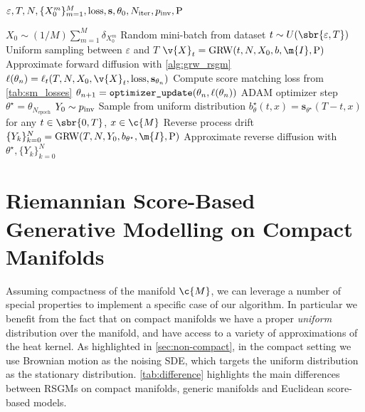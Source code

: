 \begin{algorithm}[!t]
	\caption{\small RSGM (Riemannian Score-Based Generative Model)}
	\label{alg:rsgm}
	\begin{algorithmic}[1]
		\small
		\Require $\varepsilon, T, N, \{X_0^m\}_{m=1}^M, \mathrm{loss}, \mathbf{s}, \theta_0, N_{\textrm{iter}}, p_{\textup{inv}}, \mathrm{P}$

		\State $X_0 \sim (1/M) \sum_{m=1}^M \delta_{X_0^m}$ \Comment Random mini-batch from dataset
		\State $t \sim U(\sbr{\varepsilon, T})$ \Comment Uniform sampling between $\varepsilon$ and $T$
		\State $\v{X}_t = \textrm{GRW}(t, N, X_0, b, \m{I}, \mathrm{P})$ \Comment Approximate forward diffusion with \cref{alg:grw_rsgm}
		\State $\ell(\theta_n) = \ell_t(T, N, X_0, \v{X}_t, \mathrm{loss}, \mathbf{s}_{\theta_n})$ \Comment Compute score matching loss from \cref{tab:sm_losses}
		\State $\theta_{n+1} = \verb|optimizer_update|(\theta_n, \ell(\theta_n))$ \Comment ADAM optimizer step
		\EndFor
		\State $\theta^\star = \theta_{N_{\textrm{epoch}}}$
		\State $Y_0 \sim p_{\textup{inv}}$ \Comment Sample from uniform distribution
		\State $b_\theta^\star(t, x) = \mathbf{s}_{\theta^\star}(T-t, x)$ for any $t \in \sbr{0,T}$, $x \in \c{M}$ \Comment Reverse process drift
		\State $\{Y_k\}_{k=0}^{N} = \textrm{GRW}(T, N, Y_0, b_{\theta^\star}, \m{I}, \mathrm{P})$ \Comment Approximate reverse diffusion with 
		 $\theta^\star, \{Y_k\}_{k=0}^{N}$
	\end{algorithmic}
\end{algorithm}

\section{Riemannian Score-Based Generative Modelling on Compact Manifolds}

\label{sec:compact}

Assuming compactness of the manifold $\c{M}$, we can leverage a number of special properties to implement a specific case of our algorithm.
In particular we benefit from the fact that on compact manifolds we have a proper \textit{uniform} distribution over the manifold, and have access to a variety of approximations of the heat kernel.
As highlighted in \cref{sec:non-compact}, in the compact setting we use Brownian motion as the noising SDE, which targets the uniform distribution as the stationary distribution.
\cref{tab:difference} highlights the main differences between
RSGMs on compact manifolds, generic manifolds and Euclidean score-based models.

